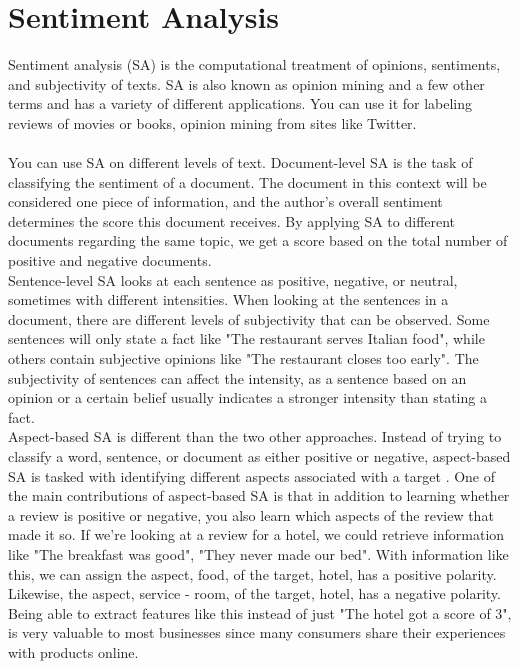 \documentclass{report}
\begin{document}
\section{Sentiment Analysis}
Sentiment analysis (SA) is the computational treatment of opinions, sentiments, and subjectivity of texts. SA is also known as opinion mining and a few other terms and has a variety of different applications. You can use it for labeling reviews of movies or books, opinion mining from sites like Twitter.\\\\
You can use SA on different levels of text. Document-level SA is the task of classifying the sentiment of a document. The document in this context will be considered one piece of information, and the author's overall sentiment determines the score this document receives. By applying SA to different documents regarding the same topic, we get a score based on the total number of positive and negative documents.\\
Sentence-level SA looks at each sentence as positive, negative, or neutral, sometimes with different intensities. When looking at the sentences in a document, there are different levels of subjectivity that can be observed. Some sentences will only state a fact like "The restaurant serves Italian food", while others contain subjective opinions like "The restaurant closes too early". The subjectivity of sentences can affect the intensity, as a sentence based on an opinion or a certain belief usually indicates a stronger intensity than stating a fact.\\%
Aspect-based SA is different than the two other approaches. Instead of trying to classify a word, sentence, or document as either positive or negative, aspect-based SA is tasked with identifying different aspects associated with a target \cite{pontiki-etal-2016-semeval}. One of the main contributions of aspect-based SA is that in addition to learning whether a review is positive or negative, you also learn which aspects of the review that made it so. If we're looking at a review for a hotel, we could retrieve information like "The breakfast was good", "They never made our bed". With information like this, we can assign the aspect, food, of the target, hotel, has a positive polarity. Likewise, the aspect, service - room, of the target, hotel, has a negative polarity. Being able to extract features like this instead of just "The hotel got a score of 3", is very valuable to most businesses since many consumers share their experiences with products online.\\\\
\end{document}
